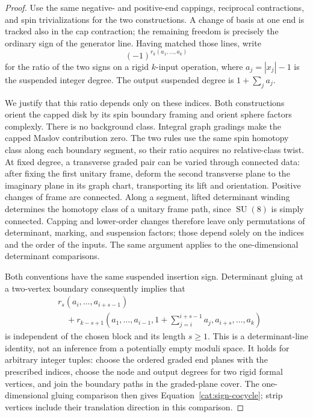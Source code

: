 \documentclass[11pt]{article}
\theoremstyle{definition}
\theoremstyle{remark}
\numberwithin{equation}{section}
\begin{document}
\begin{proof}
Use the same negative- and positive-end cappings, reciprocal
contractions, and spin trivializations for the two constructions.
A change of basis at one end is tracked also in the cap contraction;
the remaining freedom is precisely the ordinary sign of the generator
line.  Having matched those lines, write
\[
 (-1)^{r_k(a_1,\ldots,a_k)}
\]
for the ratio of the two signs on a rigid \(k\)-input operation, where
\(a_j=|x_j|-1\) is the suspended integer degree.
The output suspended degree is \(1+\sum_j a_j\).

We justify that this ratio depends only on these indices.
Both constructions orient the capped disk by its spin boundary
framing and orient sphere factors complexly.  There is no background
class.  Integral graph gradings make the capped Maslov contribution
zero.  The two rules use the same spin homotopy class along each
boundary segment, so their ratio acquires no relative-class twist.
At fixed degree, a transverse graded pair can be varied through
connected data: after fixing the first unitary frame, deform the
second transverse plane to the imaginary plane in its graph chart,
transporting its lift and orientation.  Positive changes of frame
are connected.  Along a segment, lifted determinant winding determines
the homotopy class of a unitary frame path, since \(\operatorname{SU}(8)\) is simply
connected.  Capping and lower-order changes therefore leave only
permutations of determinant, marking, and suspension factors; those
depend solely on the indices and the order of the inputs.
The same argument applies to the one-dimensional determinant
comparisons.

Both conventions have the same suspended insertion sign.
Determinant gluing at a two-vertex boundary consequently implies that
\begin{equation}\label{cat:sign-cocycle}
 \begin{split}
 &r_s(a_i,\ldots,a_{i+s-1})\\
 &\quad+
 r_{k-s+1}\left(a_1,\ldots,a_{i-1},
         1+\sum_{j=i}^{i+s-1}a_j,
         a_{i+s},\ldots,a_k\right)
 \end{split}
\end{equation}
is independent of the chosen block and its length \(s\ge1\).
This is a determinant-line identity, not an inference from a
potentially empty moduli space.  It holds for arbitrary integer
tuples: choose the ordered graded end planes with the prescribed
indices, choose the node and output degrees for two rigid formal
vertices, and join the boundary paths in the graded-plane cover.
The one-dimensional gluing comparison then gives
Equation~\eqref{cat:sign-cocycle}; strip vertices include their
translation direction in this comparison.


\end{proof}
\end{document}
